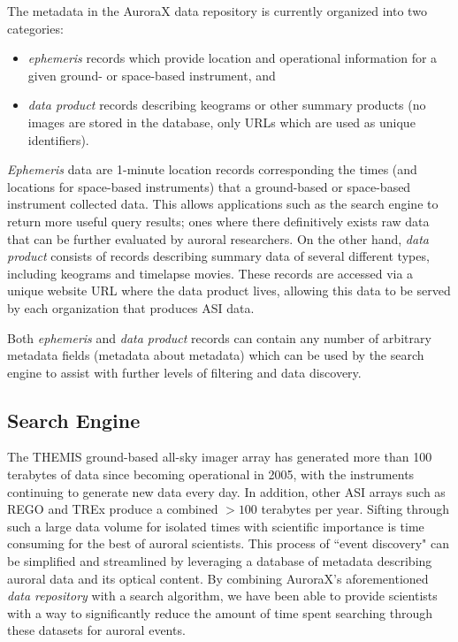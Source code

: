 \documentclass[utf8]{FrontiersinHarvard} %
\begin{document}
The metadata in the AuroraX data repository is currently organized into two categories: 
\begin{itemize}
    \item \textit{ephemeris} records which provide location and operational information for a given ground- or space-based instrument, and
    \item \textit{data product} records describing keograms or other summary products (no images are stored in the database, only URLs which are used as unique identifiers).
\end{itemize} \textit{Ephemeris} data are 1-minute location records corresponding the times (and locations for space-based instruments) that a ground-based or space-based instrument collected data. This allows applications such as the search engine to return more useful query results; ones where there definitively exists raw data that can be further evaluated by auroral researchers. On the other hand, \textit{data product} consists of records describing summary data of several different types, including keograms and timelapse movies. These records are accessed via a unique website URL where the data product lives, allowing this data to be served by each organization that produces ASI data.

Both \textit{ephemeris} and \textit{data product} records can contain any number of arbitrary metadata fields (metadata about metadata) which can be used by the search engine to assist with further levels of filtering and data discovery.

\subsection{Search Engine}
The THEMIS ground-based all-sky imager array has generated more than 100 terabytes of data since becoming operational in 2005, with the instruments continuing to generate new data every day. In addition, other ASI arrays such as REGO and TREx produce a combined $>100$ terabytes per year. Sifting through such a large data volume for isolated times with scientific importance is time consuming for the best of auroral scientists. This process of ``event discovery" can be simplified and streamlined by leveraging a database of metadata describing auroral data and its optical content. By combining AuroraX’s aforementioned \textit{data repository} with a search algorithm, we have been able to provide scientists with a way to significantly reduce the amount of time spent searching through these datasets for auroral events. 
\end{document}
